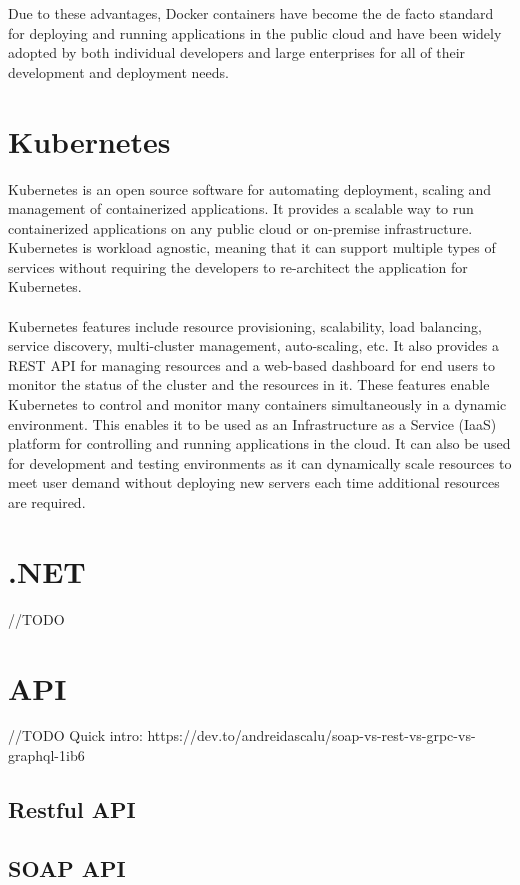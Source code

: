 \documentclass[MMR,Master,nenglish]{twbook}%
\begin{document}
\noindent
Due to these advantages, Docker containers have become the de facto standard for deploying and running applications in the public cloud and have been widely adopted by both individual developers and large enterprises for all of their development and deployment needs.


\section{Kubernetes}
Kubernetes is an open source software for automating deployment, scaling and management of containerized applications. It provides a scalable way to run containerized applications on any public cloud or on-premise infrastructure. Kubernetes is workload agnostic, meaning that it can support multiple types of services without requiring the developers to re-architect the application for Kubernetes.\cite{luk2018}
\\
\\
Kubernetes features include resource provisioning, scalability, load balancing, service discovery, multi-cluster management, auto-scaling, etc. It also provides a REST API for managing resources and a web-based dashboard for end users to monitor the status of the cluster and the resources in it. These features enable Kubernetes to control and monitor many containers simultaneously in a dynamic environment. This enables it to be used as an Infrastructure as a Service (IaaS) platform for controlling and running applications in the cloud. It can also be used for development and testing environments as it can dynamically scale resources to meet user demand without deploying new servers each time additional resources are required.\cite{kubernetes}

\section{.NET}
//TODO

\section{API}
//TODO
Quick intro:
https://dev.to/andreidascalu/soap-vs-rest-vs-grpc-vs-graphql-1ib6
\subsection{Restful API}
\subsection{SOAP API}
\end{document}
